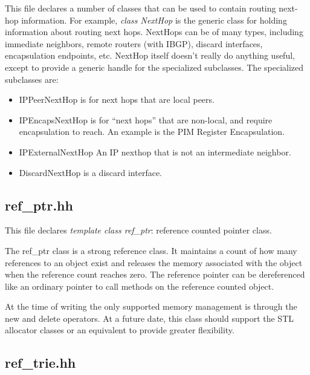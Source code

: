 \documentclass[11pt]{article}
\begin{document}
This file declares a number of classes that can be used to contain
routing next-hop information. For example, \emph{class NextHop}
is the generic class for holding information about routing
next hops.  NextHops can be of many types, including immediate
neighbors, remote routers (with IBGP), discard interfaces,
encapsulation endpoints, etc.  NextHop itself doesn't really do
anything useful, except to provide a generic handle for the
specialized subclasses. The specialized subclasses are:

\begin{itemize}

  \item IPPeerNextHop is for next hops that are local peers.

  \item IPEncapsNextHop is for ``next hops'' that are non-local, and require
   encapsulation to reach. An example is the PIM Register Encapsulation.

  \item IPExternalNextHop An IP nexthop that is not an intermediate
  neighbor.

  \item DiscardNextHop is a discard interface.

\end{itemize}


\subsection{ref\_ptr.hh}

This file declares \emph{template class ref\_ptr}: reference counted
pointer class. 

The ref\_ptr class is a strong reference class.  It maintains a count of
how many references to an object exist and releases the memory associated
with the object when the reference count reaches zero.  The reference
pointer can be dereferenced like an ordinary pointer to call methods
on the reference counted object.

At the time of writing the only supported memory management is
through the new and delete operators.  At a future date, this class
should support the STL allocator classes or an equivalent to
provide greater flexibility.

\subsection{ref\_trie.hh}
\end{document}
